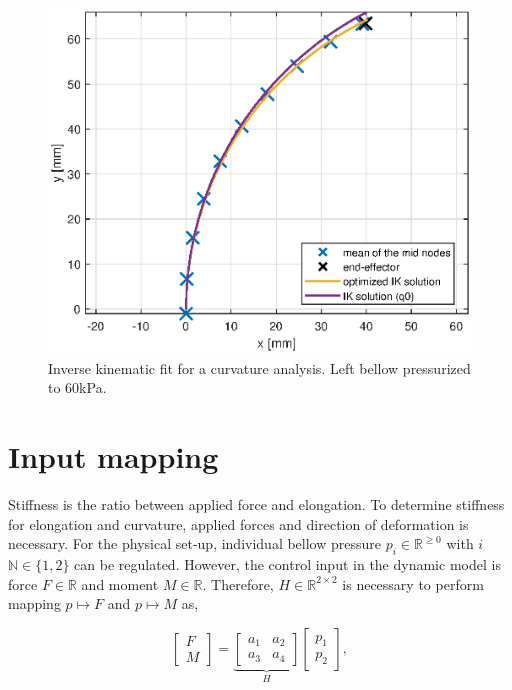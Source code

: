 \begin{figure}[H]
\begin{minipage}{0.5\textwidth}
    \end{minipage}\hfill
    \begin{minipage}{0.5\textwidth}
        \centering
        \includegraphics[width=\textwidth]{Figures/Chapter3/nodalfit.eps} 
        \caption{Inverse kinematic fit for a curvature analysis. Left bellow pressurized to 60kPa.}
        \label{fig3:nodalfitcurv}
    \end{minipage}
\end{figure}







\section{Input mapping}
\label{sec3:InputMapping}

Stiffness is the ratio between applied force and elongation. To determine  stiffness for elongation and curvature, applied forces and direction of deformation is necessary. For the physical set-up, individual bellow pressure $p_i \in \mathbb{R}^{\geq 0}$ with $i$ $\mathbb{N} \in \{1,2\}$ can be regulated. However, the control input in the dynamic model is force $F \in \mathbb{R}$ and moment $M \in \mathbb{R}$. Therefore, $H \in \mathbb{R}^{2 \times 2}$ is necessary to perform mapping $p \mapsto F$ and $p \mapsto M$ as,

\begin{equation}
     \begin{bmatrix} F \\ M \end{bmatrix}     = \underbrace{\begin{bmatrix}  a_1 & a_2 \\ a_3 & a_4 \end{bmatrix}}_{H}         \begin{bmatrix}  p_1 \\ p_2 \end{bmatrix}, \label{eq3:H}
\end{equation}

